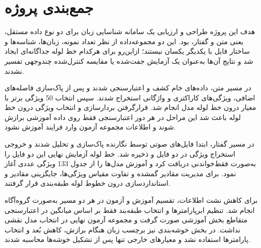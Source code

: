 


\section{جمع‌بندی پروژه}

هدف این پروژه طراحی و ارزیابی یک سامانه شناسایی زبان برای دو نوع داده مستقل، یعنی متن و گفتار، بود. این دو مجموعه‌داده از نظر تعداد نمونه، زبان‌ها، شناسه‌ها و ساختار فایل با یکدیگر یکسان نیستند؛ ازاین‌رو برای هرکدام خط لوله جداگانه‌ای ایجاد شد و نتایج آن‌ها به‌عنوان یک آزمایش جفت‌شده یا مقایسه کنترل‌شده چندوجهی تفسیر نشدند.

در مسیر متن، داده‌های خام کشف و اعتبارسنجی شدند و پس از پاک‌سازی فاصله‌های اضافی، ویژگی‌های کاراکتری و واژگانی
استخراج شدند. سپس انتخاب 50 ویژگی برتر با معیار
درون خط لوله مدل انجام شد. قرارگرفتن بردارسازی و انتخاب ویژگی درون خط لوله باعث شد این مراحل در هر دور اعتبارسنجی فقط روی داده آموزشی برازش شوند و اطلاعات مجموعه آزمون وارد فرایند آموزش نشود.

در مسیر گفتار، ابتدا فایل‌های صوتی توسط نگارنده پاک‌سازی و تحلیل شدند و خروجی استخراج ویژگی در دو فایل
و
ذخیره شد. خط لوله آزمایش نهایی این دو فایل را به‌صورت فقط‌خواندنی دریافت کرد و آموزش مدل‌ها را از جدول 133 ویژگی عددی آغاز نمود. برای مدیریت مقادیر گمشده و تفاوت مقیاس ویژگی‌ها، جایگزینی مقادیر و استانداردسازی درون خطوط لوله طبقه‌بندی قرار گرفتند.

برای کاهش نشت اطلاعات، تقسیم آموزش و آزمون در هر دو مسیر به‌صورت گروه‌آگاه انجام شد. تنظیم ابرپارامترها و انتخاب طبقه‌بند فقط بر اساس میانگین
در اعتبارسنجی متقاطع بخش آموزشی صورت گرفت و مجموعه آزمون نهایی در انتخاب مدل نقشی نداشت. در بخش خوشه‌بندی نیز برچسب زبان هنگام برازش، کاهش بُعد و انتخاب پارامترها استفاده نشد و معیارهای خارجی تنها پس از تشکیل خوشه‌ها محاسبه شدند.

